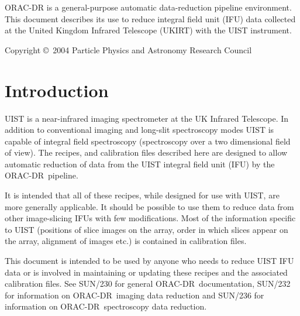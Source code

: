 \documentclass[twoside,11pt]{article}
\newcommand{\stardocinitials}  {SUN}
\newcommand{\stardoccopyright} {Copyright \copyright\ 2004 Particle Physics and Astronomy Research Council}
\newcommand{\stardocnumber}    {246.2}
\newcommand{\stardocabstract}  {ORAC-DR is a
general-purpose automatic data-reduction pipeline environment.  This
document describes its use to reduce integral field unit (IFU) data
collected at the United Kingdom Infrared Telescope (UKIRT) with the
UIST instrument. }
\newcommand{\stardocname}{\stardocinitials /\stardocnumber}
\newenvironment{latexonly}{}{}
\newcommand{\xref}[3]{#1}
\renewcommand{\_}{\texttt{\symbol{95}}}
\newcommand{\ORACDR}{{\footnotesize ORAC-DR}}
\renewcommand{\thepage}{\roman{page}}
\begin{document}
\stardocabstract

\begin{latexonly}
\newpage
\vspace*{\fill}
\stardoccopyright
\end{latexonly}

  \newpage
  \begin{latexonly}
    \setlength{\parskip}{0mm}
    \tableofcontents
    \setlength{\parskip}{\medskipamount}
    \markboth{\stardocname}{\stardocname}
  \end{latexonly}

\cleardoublepage
\renewcommand{\thepage}{\arabic{page}}
\setcounter{page}{1}



\section{Introduction}

UIST is a near-infrared imaging spectrometer at the UK Infrared
Telescope. In addition to conventional imaging and long-slit
spectroscopy modes UIST is capable of integral field spectroscopy
(spectroscopy over a two dimensional field of view). The recipes,
and calibration files described here are designed to allow
automatic reduction of data from the UIST integral field unit (IFU) by
the \ORACDR\ pipeline.

It is intended that all of these recipes, while designed for use with
UIST, are more generally applicable. It should be possible to use them
to reduce data from other image-slicing IFUs with few
modifications. Most of the information specific to UIST (positions of
slice images on the array, order in which slices appear on the array,
alignment of images etc.) is contained in calibration files. 

This document is intended to be used by anyone who needs to reduce
UIST IFU data or is involved in maintaining or updating these recipes
and the associated calibration files. See \xref{SUN/230}{sun230}{} for
general \ORACDR\ documentation, \xref{SUN/232}{sun232}{} for
information on \ORACDR\ imaging data reduction and
\xref{SUN/236}{sun236}{} for information on \ORACDR\ spectroscopy data
reduction.
\end{document}
